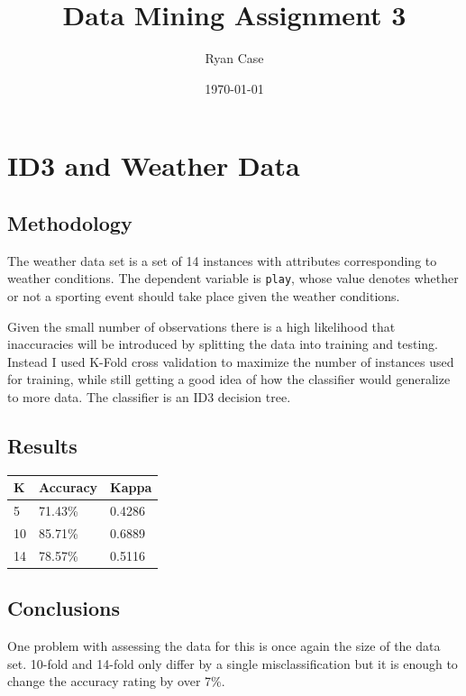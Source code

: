 \documentclass[11pt, letterpaper]{report}
\begin{document}
\title{Data Mining Assignment 3}
\author{Ryan Case}
\date{\today}
\maketitle{}

\section{ID3 and Weather Data}

\subsection{Methodology}

The weather data set is a set of 14 instances with attributes corresponding to weather conditions. The dependent variable is \texttt{play}, whose value denotes whether or not a sporting event should take place given the weather conditions.

Given the small number of observations there is a high likelihood that inaccuracies will be introduced by splitting the data into training and testing. Instead I used K-Fold cross validation to maximize the number of instances used for training, while still getting a good idea of how the classifier would generalize to more data. The classifier is an ID3 decision tree.

\subsection{Results}

\begin{tabular}{ |l l l| }
    \hline
    \textbf{K} & \textbf{Accuracy} & \textbf{Kappa} \\ \hline
    5 & 71.43\% & 0.4286 \\
    10 & 85.71\% & 0.6889 \\
    14 & 78.57\% & 0.5116 \\
    \hline
\end{tabular}

\bigskip
\subsection{Conclusions}

One problem with assessing the data for this is once again the size of the data set. 10-fold and 14-fold only differ by a single misclassification but it is enough to change the accuracy rating by over 7\%.
\end{document}
